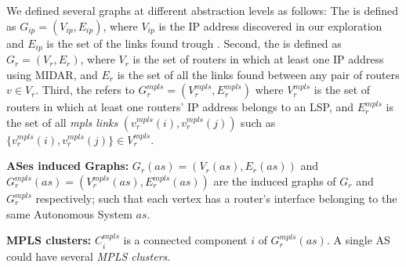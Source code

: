 We defined several graphs at different abstraction levels as follows:
The  is defined as $G_{ip}=(V_{ip}, E_{ip})$, where $V_{ip}$
is the IP address discovered in our exploration and $E_{ip}$ is the set of the
links found trough \traceroute.   Second, the  is
defined as $G_{r}=(V_{r}, E_{r})$, where $V_{r}$ is the set of routers in which
at least one IP address using MIDAR, and $E_{r}$ is the set of all the links
found between any pair of routers $v\in V_{r}$. Third, the  refers to $G^{mpls}_{r}=(V^{mpls}_{r}, E^{mpls}_{r})$
where  $V^{mpls}_{r}$ is the set of routers in which at least one routers' IP
address belongs to an LSP, and  $E^{mpls}_{r}$ is the set of all \textit{mpls
links} $(v^{mpls}_{r}(i), v^{mpls}_{r}(j))$ such as
$\{{v^{mpls}_{r}(i)},{v^{mpls}_{r}(j)} \}\in V^{mpls}_{r}$.


   

\textbf{ASes induced Graphs:} $G_{r}(as)=(V_{r}(as), E_{r}(as))$ and
$G^{mpls}_{r}(as)=(V^{mpls}_{r}(as), E^{mpls}_{r}(as))$ are the induced graphs
of $G_{r}$ and $G^{mpls}_{r}$ respectively; such that each vertex has a router's
interface belonging to the same Autonomous System $as$.

\textbf{MPLS clusters:} $C^{mpls}_{i}$ is a connected component $i$ of
$G^{mpls}_{r}(as)$. A single AS could have several \textit{MPLS clusters}.

